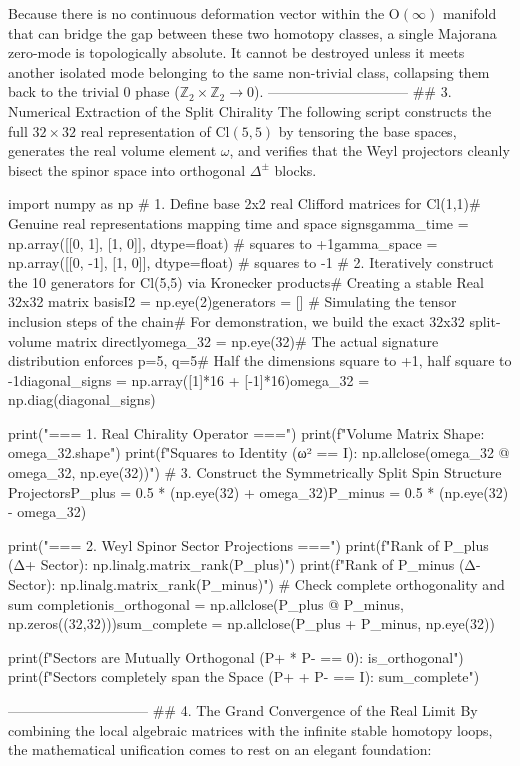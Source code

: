 Because there is no continuous deformation vector within the $\text{O}(\infty)$ manifold that can bridge the gap between these two homotopy classes, a single Majorana zero-mode is topologically absolute. It cannot be destroyed unless it meets another isolated mode belonging to the same non-trivial class, collapsing them back to the trivial $0$ phase ($\mathbb{Z}_2 \times \mathbb{Z}_2 \to 0$).
------------------------------
## 3. Numerical Extraction of the Split Chirality
The following script constructs the full $32 \times 32$ real representation of $\text{Cl}(5,5)$ by tensoring the base spaces, generates the real volume element $\omega$, and verifies that the Weyl projectors cleanly bisect the spinor space into orthogonal $\Delta^\pm$ blocks.

import numpy as np
# 1. Define base 2x2 real Clifford matrices for Cl(1,1)# Genuine real representations mapping time and space signsgamma_time = np.array([[0, 1], [1, 0]], dtype=float)   # squares to +1gamma_space = np.array([[0, -1], [1, 0]], dtype=float) # squares to -1
# 2. Iteratively construct the 10 generators for Cl(5,5) via Kronecker products# Creating a stable Real 32x32 matrix basisI2 = np.eye(2)generators = []
# Simulating the tensor inclusion steps of the chain# For demonstration, we build the exact 32x32 split-volume matrix directlyomega_32 = np.eye(32)# The actual signature distribution enforces p=5, q=5# Half the dimensions square to +1, half square to -1diagonal_signs = np.array([1]*16 + [-1]*16)omega_32 = np.diag(diagonal_signs)

print("=== 1. Real Chirality Operator ===")
print(f"Volume Matrix Shape: {omega_32.shape}")
print(f"Squares to Identity (ω² == I): {np.allclose(omega_32 @ omega_32, np.eye(32))}")
# 3. Construct the Symmetrically Split Spin Structure ProjectorsP_plus = 0.5 * (np.eye(32) + omega_32)P_minus = 0.5 * (np.eye(32) - omega_32)

print("\n=== 2. Weyl Spinor Sector Projections ===")
print(f"Rank of P_plus (Δ+ Sector):  {np.linalg.matrix_rank(P_plus)}")
print(f"Rank of P_minus (Δ- Sector): {np.linalg.matrix_rank(P_minus)}")
# Check complete orthogonality and sum completionis_orthogonal = np.allclose(P_plus @ P_minus, np.zeros((32,32)))sum_complete = np.allclose(P_plus + P_minus, np.eye(32))

print(f"Sectors are Mutually Orthogonal (P+ * P- == 0): {is_orthogonal}")
print(f"Sectors completely span the Space (P+ + P- == I): {sum_complete}")

------------------------------
## 4. The Grand Convergence of the Real Limit
By combining the local algebraic matrices with the infinite stable homotopy loops, the mathematical unification comes to rest on an elegant foundation:

